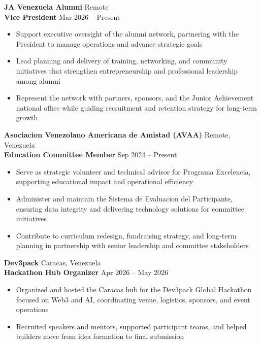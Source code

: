 \documentclass[11pt]{article}
\begin{document}
\textbf{JA Venezuela Alumni} \hfill Remote \\
\textbf{Vice President} \hfill Mar 2026 -- Present
\begin{itemize}
    \item Support executive oversight of the alumni network, partnering with the President to manage operations and advance strategic goals
    \item Lead planning and delivery of training, networking, and community initiatives that strengthen entrepreneurship and professional leadership among alumni
    \item Represent the network with partners, sponsors, and the Junior Achievement national office while guiding recruitment and retention strategy for long-term growth
\end{itemize}

\vspace{12pt}

\textbf{Asociacion Venezolano Americana de Amistad (AVAA)} \hfill Remote, Venezuela \\
\textbf{Education Committee Member} \hfill Sep 2024 -- Present
\begin{itemize}
    \item Serve as strategic volunteer and technical advisor for Programa Excelencia, supporting educational impact and operational efficiency
    \item Administer and maintain the Sistema de Evaluacion del Participante, ensuring data integrity and delivering technology solutions for committee initiatives
    \item Contribute to curriculum redesign, fundraising strategy, and long-term planning in partnership with senior leadership and committee stakeholders
\end{itemize}

\vspace{12pt}

\textbf{Dev3pack} \hfill Caracas, Venezuela \\
\textbf{Hackathon Hub Organizer} \hfill Apr 2026 -- May 2026
\begin{itemize}
    \item Organized and hosted the Caracas hub for the Dev3pack Global Hackathon focused on Web3 and AI, coordinating venue, logistics, sponsors, and event operations
    \item Recruited speakers and mentors, supported participant teams, and helped builders move from idea formation to final submission
\end{itemize}
\end{document}
